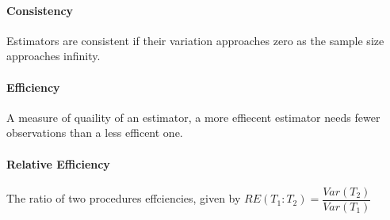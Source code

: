         \paragraph{Consistency} Estimators are consistent if their variation approaches zero as the sample size approaches infinity.

        \paragraph{Efficiency} A measure of quaility of an estimator, a more effiecent estimator needs fewer observations than a less efficent one.

        \paragraph{Relative Efficiency} The ratio of two procedures effciencies, given by $RE(T_1 : T_2) = \dfrac{Var(T_2)}{Var(T_1)}$

